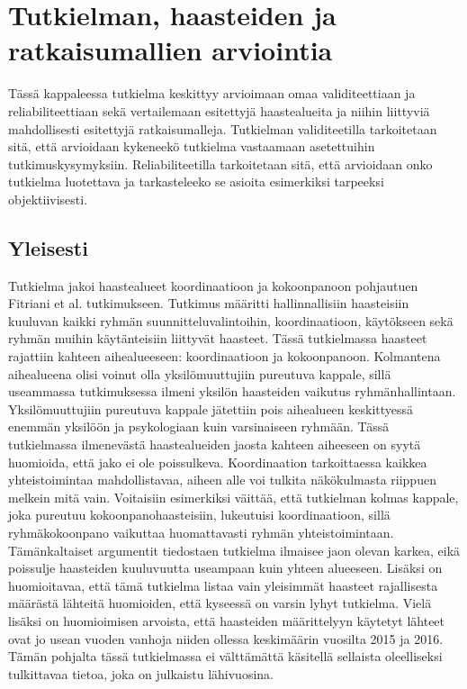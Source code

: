 \chapter{Tutkielman, haasteiden ja ratkaisumallien arviointia}

Tässä kappaleessa tutkielma keskittyy arvioimaan omaa validiteettiaan ja reliabiliteettiaan sekä vertailemaan esitettyjä haastealueita ja niihin liittyviä mahdollisesti esitettyjä ratkaisumalleja. Tutkielman validiteetilla tarkoitetaan sitä, että arvioidaan kykeneekö tutkielma vastaamaan asetettuihin tutkimuskysymyksiin. Reliabiliteetilla tarkoitetaan sitä, että arvioidaan onko tutkielma luotettava ja tarkasteleeko se asioita esimerkiksi tarpeeksi objektiivisesti.

\section{Yleisesti}

Tutkielma jakoi haastealueet koordinaatioon ja kokoonpanoon pohjautuen Fitriani et al. \cite{7872736} tutkimukseen. Tutkimus määritti hallinnallisiin haasteisiin kuuluvan kaikki ryhmän suunnitteluvalintoihin, koordinaatioon, käytökseen sekä ryhmän muihin käytänteisiin liittyvät haasteet. Tässä tutkielmassa haasteet rajattiin kahteen aihealueeseen: koordinaatioon ja kokoonpanoon. Kolmantena aihealueena olisi voinut olla yksilömuuttujiin pureutuva kappale, sillä useammassa tutkimuksessa ilmeni yksilön haasteiden vaikutus ryhmänhallintaan. Yksilömuuttujiin pureutuva kappale jätettiin pois aihealueen keskittyessä enemmän yksilöön ja psykologiaan kuin varsinaiseen ryhmään. Tässä tutkielmassa ilmenevästä haastealueiden jaosta kahteen aiheeseen on syytä huomioida, että jako ei ole poissulkeva. Koordinaation tarkoittaessa kaikkea yhteistoimintaa mahdollistavaa, aiheen alle voi tulkita näkökulmasta riippuen melkein mitä vain. Voitaisiin esimerkiksi väittää, että tutkielman kolmas kappale, joka pureutuu kokoonpanohaasteisiin, lukeutuisi koordinaatioon, sillä ryhmäkokoonpano vaikuttaa huomattavasti ryhmän yhteistoimintaan. Tämänkaltaiset argumentit tiedostaen tutkielma ilmaisee jaon olevan karkea, eikä poissulje haasteiden kuuluvuutta useampaan kuin yhteen alueeseen. Lisäksi on huomioitavaa, että tämä tutkielma listaa vain yleisimmät haasteet rajallisesta määrästä lähteitä huomioiden, että kyseessä on varsin lyhyt tutkielma. Vielä lisäksi on huomioimisen arvoista, että haasteiden määrittelyyn käytetyt lähteet ovat jo usean vuoden vanhoja niiden ollessa keskimäärin vuosilta 2015 ja 2016. Tämän pohjalta tässä tutkielmassa ei välttämättä käsitellä sellaista oleelliseksi tulkittavaa tietoa, joka on julkaistu lähivuosina.

